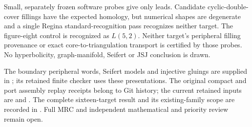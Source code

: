 \documentclass[11pt]{article}
\begin{document}
Small, separately frozen software probes give only leads. Candidate
cyclic-double-cover fillings have the expected homology, but numerical
shapes are degenerate and a single Regina standard-recognition pass
recognizes neither target. The figure-eight control is recognized as
$L(5,2)$. Neither target's peripheral filling provenance or exact
core-to-triangulation transport is certified by those probes. No
hyperbolicity, graph-manifold, Seifert or JSJ conclusion is drawn.

The boundary peripheral words, Seifert models and injective gluings are
supplied in ; its retained
finite checker uses these presentations. The original compact and port
assembly replay receipts belong to Git history; the current retained
inputs are  and
. The complete sixteen-target result and
its existing-family scope are recorded in
. Full MRC and
independent mathematical and priority review remain open.
\end{document}

